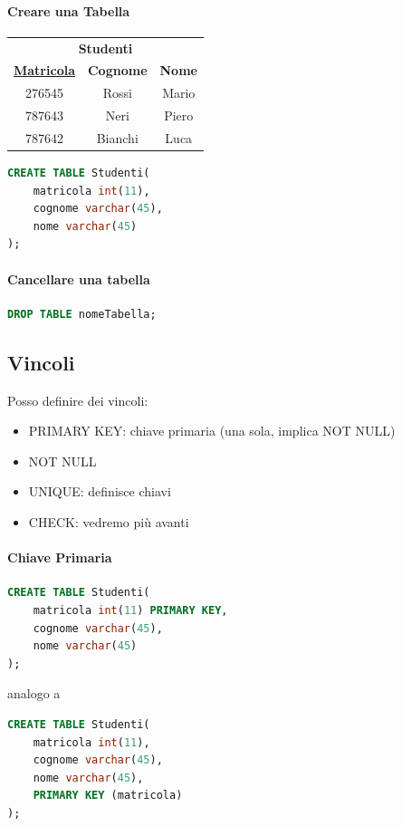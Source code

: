 \documentclass[12pt,a4paper]{article}
\begin{document}
\paragraph{Creare una Tabella}
\begin{center}
\begin{tabular}{ccc}
\multicolumn{3}{c}{\textbf{Studenti}} \\
\underline{\textbf{Matricola}} & \textbf{Cognome} & \textbf{Nome} \\ \hline
276545 & Rossi & Mario \\
787643 & Neri & Piero \\
787642 & Bianchi & Luca \\
\end{tabular}
\end{center}
\Sep \noindent
\begin{lstlisting}[language = SQL]
CREATE TABLE Studenti(
	matricola int(11),
	cognome varchar(45),
	nome varchar(45)
);
\end{lstlisting}

\paragraph{Cancellare una tabella\\}
\flushleft
\begin{lstlisting}[language = SQL]
DROP TABLE nomeTabella;
\end{lstlisting}

\subsection{Vincoli}
Posso definire dei vincoli:
\begin{itemize}
\item PRIMARY KEY: chiave primaria (una sola, implica NOT NULL)
\item NOT NULL
\item UNIQUE: definisce chiavi
\item CHECK: vedremo più avanti
\end{itemize}

\paragraph{Chiave Primaria}
\flushleft
\begin{lstlisting}[language = SQL]
CREATE TABLE Studenti(
	matricola int(11) PRIMARY KEY,
	cognome varchar(45),
	nome varchar(45)
);
\end{lstlisting}
analogo a 
\begin{lstlisting}[language = SQL]
CREATE TABLE Studenti(
	matricola int(11),
	cognome varchar(45),
	nome varchar(45),
	PRIMARY KEY (matricola)
);
\end{lstlisting}
\end{document}
